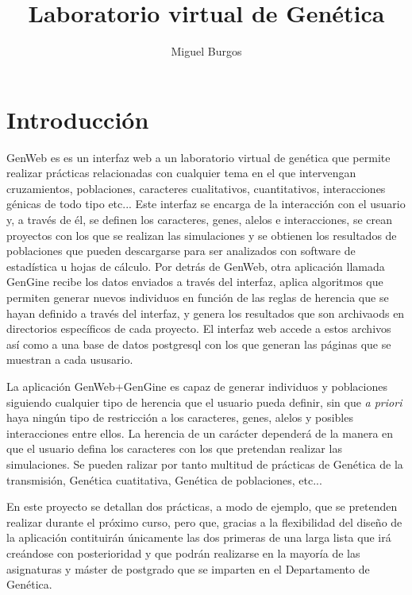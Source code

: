 \documentclass[a4paper]{article}
\title{Laboratorio virtual de Genética}
\author{Miguel Burgos}
\begin{document}
\maketitle

\tableofcontents

\section{Introducción}

GenWeb es es un interfaz web a un laboratorio virtual de genética que permite realizar prácticas relacionadas con cualquier tema en el que intervengan cruzamientos, poblaciones, caracteres cualitativos, cuantitativos, interacciones génicas de todo tipo etc... Este interfaz se encarga de la interacción con el usuario y, a través de él, se definen los caracteres, genes, alelos e interacciones, se crean proyectos con los que se realizan las simulaciones y se obtienen los resultados de poblaciones que pueden descargarse para ser analizados con software de estadística u hojas de cálculo. Por detrás de GenWeb, otra aplicación llamada  GenGine recibe los datos enviados a través del interfaz, aplica algoritmos que permiten generar nuevos individuos en función de las reglas de herencia que se hayan definido a través del interfaz, y genera los resultados que son archivaods en directorios específicos de cada proyecto. El interfaz web accede a estos archivos así como a una base de datos postgresql con los que generan las páginas que se muestran a cada ususario.

La aplicación GenWeb+GenGine es capaz de generar individuos y poblaciones siguiendo cualquier tipo de herencia que el usuario pueda definir, sin que \emph{a priori} haya ningún tipo de restricción a los caracteres, genes, alelos y posibles interacciones entre ellos. La herencia de un carácter dependerá de la manera en que el usuario defina los caracteres con los que pretendan realizar las simulaciones. Se pueden ralizar por tanto multitud de prácticas de Genética de la transmisión, Genética cuatitativa, Genética de poblaciones, etc...

En este proyecto se detallan dos prácticas, a modo de ejemplo, que se pretenden realizar durante el próximo curso, pero que, gracias a la flexibilidad del diseño de la aplicación contituirán únicamente las dos primeras de una larga lista que irá creándose con posterioridad y que podrán realizarse en la mayoría de las asignaturas y máster de postgrado que se imparten en el Departamento de Genética.
\end{document}
